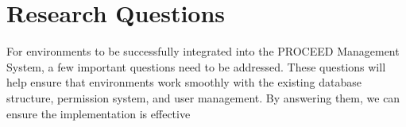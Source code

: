
%
%
%


\section{Research Questions}
\label{cha:researchquestions}

For environments to be successfully integrated into the PROCEED Management System,
a few important questions need to be addressed.
These questions will help ensure that environments work smoothly with the existing database structure,
permission system, and user management.
By answering them, we can ensure the implementation is effective



